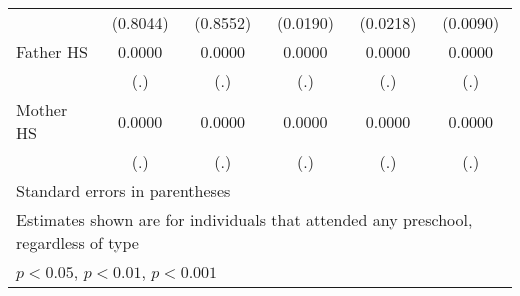 \begin{table}[htbp]
\begin{tabular}{l*{5}{c}}
            &    (0.8044)         &    (0.8552)         &    (0.0190)         &    (0.0218)         &    (0.0090)         \\
\addlinespace
Father HS   &      0.0000         &      0.0000         &      0.0000         &      0.0000         &      0.0000         \\
            &         (.)         &         (.)         &         (.)         &         (.)         &         (.)         \\
\addlinespace
Mother HS   &      0.0000         &      0.0000         &      0.0000         &      0.0000         &      0.0000         \\
            &         (.)         &         (.)         &         (.)         &         (.)         &         (.)         \\
\bottomrule
\multicolumn{6}{l}{\footnotesize Standard errors in parentheses}\\
\multicolumn{6}{l}{\footnotesize Estimates shown are for individuals that attended any preschool, regardless of type}\\
\multicolumn{6}{l}{\footnotesize \sym{*} \(p<0.05\), \sym{**} \(p<0.01\), \sym{***} \(p<0.001\)}\\
\end{tabular}
\end{table}
